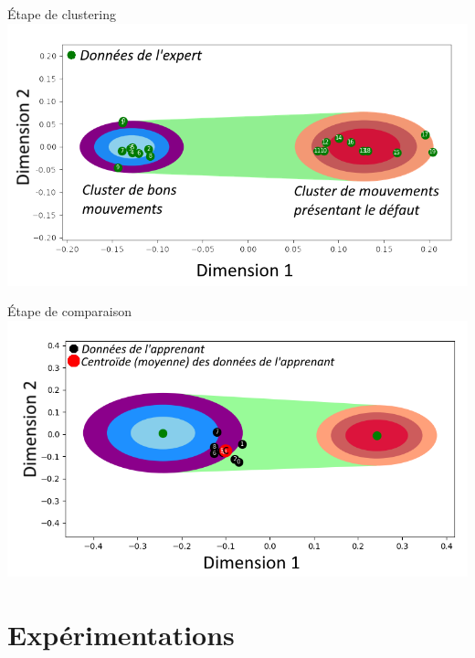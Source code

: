 \documentclass[svgnames]{beamer}
\begin{document}
	\begin{frame}{Étape de clustering}
	\centering
		\includegraphics[scale=0.65]{img/feedback_expert_cluster_example.png}
	\end{frame}
	
	\begin{frame}{Étape de comparaison}
	\centering
		\includegraphics[scale=0.53]{img/feedback_one.png}
	\end{frame}


	\section{Expérimentations}
\end{document}
